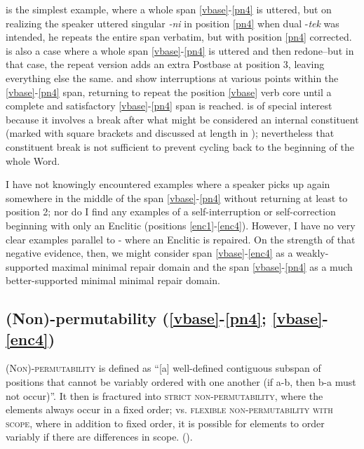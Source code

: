 \documentclass[output=paper]{langscibook}
\begin{document}
 is the simplest example, where a whole span \ref{vbase}-\ref{pn4} is uttered, but on realizing the speaker uttered singular \textit{{}-ni} in position \ref{pn4} when dual -\textit{tek} was intended, he repeats the entire span verbatim, but with position \ref{pn4} corrected.  is also a case where a whole span \ref{vbase}-\ref{pn4} is uttered and then redone--but in that case, the repeat version adds an extra Postbase at position 3, leaving everything else the same.  and  show interruptions at various points within the \ref{vbase}-\ref{pn4} span, returning to repeat the position \ref{vbase} verb core until a complete and satisfactory \ref{vbase}-\ref{pn4} span is reached.  is of special interest because it involves a break after what might be considered an internal constituent (marked with square brackets and discussed at length in ); nevertheless that constituent break is not sufficient to prevent cycling back to the beginning of the whole Word. 

I have not knowingly encountered examples where a speaker picks up again somewhere in the middle of the span \ref{vbase}-\ref{pn4} without returning at least to position 2; nor do I find any examples of a self-interruption or self-correction beginning with only an Enclitic (positions \ref{enc1}-\ref{enc4}). However, I have no very clear examples parallel to - where an Enclitic is repaired. On the strength of that negative evidence, then, we might consider span \ref{vbase}-\ref{enc4} as a weakly-supported maximal minimal repair domain and the span \ref{vbase}-\ref{pn4} as a much better-supported minimal minimal repair domain.

\subsection{(Non)-permutability (\ref{vbase}-\ref{pn4}; \ref{vbase}-\ref{enc4})} \label{sec:5.4}

 \textsc{(Non)-permutability} is defined as ``[a] well-defined contiguous subspan of positions that cannot be variably ordered with one another (if a-b, then b-a must not occur)''. It then is fractured into \textsc{strict} \textsc{non-permutability}, where the elements always occur in a fixed order; vs. \textsc{flexible} \textsc{non-permutability} \textsc{with} \textsc{scope}, where in addition to fixed order, it is possible for elements to order variably if there are differences in scope. (\citealt[16, 24]{Tallman2021}).
\end{document}
